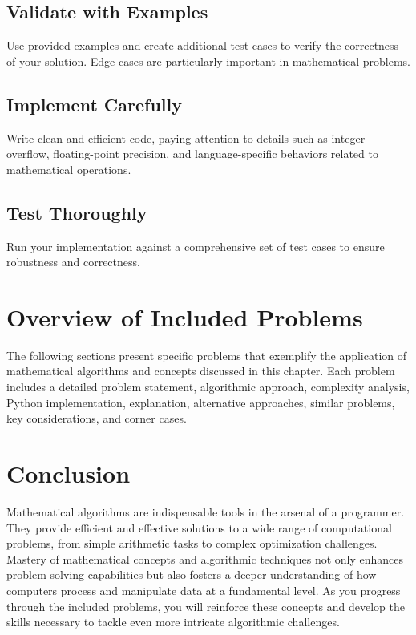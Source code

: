 \subsection{Validate with Examples}
Use provided examples and create additional test cases to verify the correctness of your solution. Edge cases are particularly important in mathematical problems.

\subsection{Implement Carefully}
Write clean and efficient code, paying attention to details such as integer overflow, floating-point precision, and language-specific behaviors related to mathematical operations.

\subsection{Test Thoroughly}
Run your implementation against a comprehensive set of test cases to ensure robustness and correctness.

\section{Overview of Included Problems}
The following sections present specific problems that exemplify the application of mathematical algorithms and concepts discussed in this chapter. Each problem includes a detailed problem statement, algorithmic approach, complexity analysis, Python implementation, explanation, alternative approaches, similar problems, key considerations, and corner cases.


\section{Conclusion}
Mathematical algorithms are indispensable tools in the arsenal of a programmer. They provide efficient and effective solutions to a wide range of computational problems, from simple arithmetic tasks to complex optimization challenges. Mastery of mathematical concepts and algorithmic techniques not only enhances problem-solving capabilities but also fosters a deeper understanding of how computers process and manipulate data at a fundamental level. As you progress through the included problems, you will reinforce these concepts and develop the skills necessary to tackle even more intricate algorithmic challenges.

\printindex